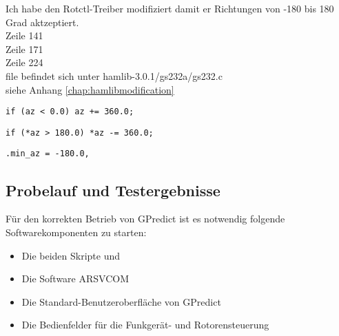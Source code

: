 \newpage

Ich habe den Rotctl-Treiber modifiziert damit er Richtungen von -180 bis 180 Grad aktzeptiert.\\
Zeile 141\\
Zeile 171\\
Zeile 224\\
file befindet sich unter hamlib-3.0.1/gs232a/gs232.c\\
siehe Anhang \ref{chap:hamlibmodification}

\vspace{-1em}
\begin{shaded}
	\normalsize{\texttt{if (az < 0.0) az += 360.0;}}
\end{shaded}

\vspace{-1em}
\begin{shaded}
	\normalsize{\texttt{if (*az > 180.0) *az -= 360.0;}}
\end{shaded}

\vspace{-1em}
\begin{shaded}
	\normalsize{\texttt{.min\_az = -180.0,}}
\end{shaded}

\newpage

\subsection{Probelauf und Testergebnisse}
\label{chap:probelauf}

Für den korrekten Betrieb von GPredict ist es notwendig folgende Softwarekomponenten zu starten:

\begin{itemize}
	\parskip0pt
	\item Die beiden Skripte  und 
	\item Die Software ARSVCOM
	\item Die Standard-Benutzeroberfläche von GPredict
	\item Die Bedienfelder für die Funkgerät- und Rotorensteuerung
\end{itemize}

